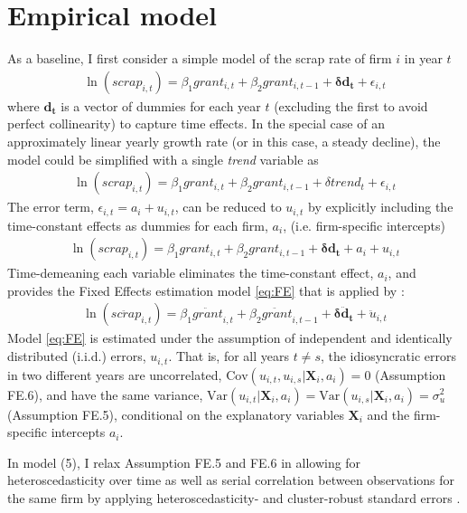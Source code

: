 \section{Empirical model}
\label{s:model}
As a baseline, I first consider a simple model of the scrap rate of firm $i$ in year $t$
\begin{align}\label{eq:baseline}
    \ln\left(scrap_{i,t}\right)
    = \beta_1grant_{i,t} + \beta_2grant_{i,t-1} + \bm{\delta d_t} + \epsilon_{i,t}
\end{align}
where $\bm{d_t}$ is a vector of dummies for each year $t$ (excluding the first to avoid perfect collinearity) to capture time effects. In the special case of an approximately linear yearly growth rate (or in this case, a steady decline), the model could be simplified with a single \emph{trend} variable as
\begin{align}\label{eq:trend}
    \ln\left(scrap_{i,t}\right)
    = \beta_1grant_{i,t} + \beta_2grant_{i,t-1} + \delta trend_t + \epsilon_{i,t}
\end{align}
The error term, $\epsilon_{i,t}=a_i+u_{i,t}$, can be reduced to $u_{i,t}$ by explicitly including the time-constant effects as dummies for each firm, $a_i$, (i.e. firm-specific intercepts)
\begin{align}\label{eq:dummies}
    \ln\left(scrap_{i,t}\right)
    = \beta_1grant_{i,t} + \beta_2grant_{i,t-1} + \bm{\delta d_t} + a_i + u_{i,t}
\end{align}
Time-demeaning each variable eliminates the time-constant effect, $a_i$, and provides the Fixed Effects estimation model \eqref{eq:FE} that is applied by \citet[example 14.1, pp. 464-465]{wooldridge2019introductory}:
\begin{align}\label{eq:FE}
    \ln\left(\ddot{scrap}_{i,t}\right)
    = \beta_1\ddot{grant}_{i,t} + \beta_2\ddot{grant}_{i,t-1} + \bm{\delta \ddot{d}_t} + \ddot{u}_{i,t}
\end{align}
Model \eqref{eq:FE} is estimated under the assumption of independent and identically distributed (i.i.d.) errors, $u_{i,t}$. That is, for all years $t\neq s$, the idiosyncratic errors in two different years are uncorrelated, $\text{Cov}(u_{i,t},u_{i,s}|\bm{X}_i,a_i)=0$ (Assumption FE.6), and have the same variance, $\text{Var}(u_{i,t}|\bm{X}_i,a_i)=\text{Var}(u_{i,s}|\bm{X}_i,a_i)=\sigma^2_u$ (Assumption FE.5), conditional on the explanatory variables $\bm{X}_i$ and the firm-specific intercepts $a_i$.

In model (5), I relax Assumption FE.5 and FE.6 in allowing for heteroscedasticity over time as well as serial correlation between observations for the same firm by applying heteroscedasticity- and cluster-robust standard errors \citep*[see][appendix 14A.2, pp. 493-494]{wooldridge2019introductory}.